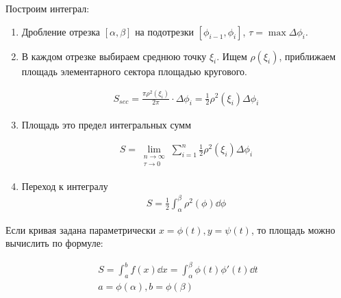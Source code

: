 
\begin{twocolumns}
  
  \columnbreak

  Построим интеграл:
  \begin{enumerate}
    \item Дробление отрезка \([\alpha, \beta]\) на подотрезки
      \([\phi_{i - 1}, \phi_{i}]\), \(\tau = \max \Delta \phi_{i}\).

    \item В каждом отрезке выбираем среднюю точку \(\xi_{i}\). Ищем
      \(\rho(\xi_{i})\), приближаем площадь элементарного сектора площадью
      кругового.
    
      \begin{align*}
        S_{sec}
        = \frac{\pi \rho^2(\xi_{i})}{2 \pi} \cdot \Delta \phi_{i}
        = \frac{1}{2} \rho^2(\xi_{i}) \Delta \phi_{i}
      \end{align*}

    \item Площадь это предел интегральных сумм
    
    \begin{align*}
      S = \lim_{\substack{n \to \infty \\ \tau \to 0}}
        \sum_{i = 1}^{n} \frac{1}{2} \rho^2(\xi_{i}) \Delta \phi_{i}
    \end{align*}
    
    \item Переход к интегралу
    \begin{align*}
      S = \frac{1}{2} \int_{\alpha}^{\beta} \rho^2(\phi) \dd \phi
    \end{align*}
  \end{enumerate}
\end{twocolumns}

\begin{remark}
  Если кривая задана параметрически \(x = \phi(t), y = \psi(t)\), то площадь
  можно вычислить по формуле:

  \begin{align*}
    S
    = \int_{a}^{b} f(x) \dd x
    = \int_{\alpha}^{\beta} \phi(t) \phi'(t) \dd t \\
    a = \phi(\alpha), b = \phi(\beta)
  \end{align*}
\end{remark}